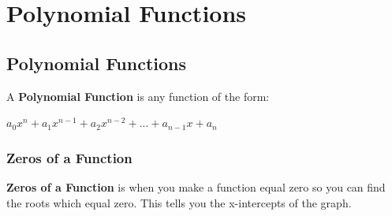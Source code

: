 \chapter{Polynomial Functions}

\section{Polynomial Functions}
A \textbf{Polynomial Function} is any function of the form:\\
\begin{center}
	$a_0x^n +a_1x^{n-1}  +a_2x^{n-2} +...+ a_{n-1}x+ a_n$ 
\end{center}

\subsection{Zeros of a Function}
\textbf{Zeros of a Function} is when you make a function equal zero so you can find the roots which equal zero. This tells you the x-intercepts of the graph. \\
\\
